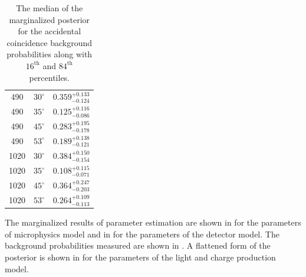 \begin{table}[p]
\begin{tabular}{cc|c}
490 & $30^{\circ}$ & $0.359^{+0.133}_{-0.124}$ \\
490 & $35^{\circ}$ & $0.125^{+0.116}_{-0.086}$ \\
490 & $45^{\circ}$ & $0.283^{+0.195}_{-0.178}$ \\
490 & $53^{\circ}$ & $0.189^{+0.138}_{-0.121}$ \\

1020 & $30^{\circ}$ & $0.384^{+0.150}_{-0.154}$ \\
1020 & $35^{\circ}$ & $0.108^{+0.115}_{-0.071}$ \\
1020 & $45^{\circ}$ & $0.364^{+0.247}_{-0.203}$ \\
1020 & $53^{\circ}$ & $0.264^{+0.109}_{-0.113}$ \\

\end{tabular}
\caption{The median of the marginalized posterior for the accidental coincidence background probabilities along with $16^{\textrm{th}}$ and $84^{\textrm{th}}$ percentiles.}
\label{tab:nerix_bkg_prob}



\end{table}





The marginalized results of parameter estimation are shown in  for the parameters of microphysics model and in  for the parameters of the detector model.  The background probabilities measured are shown in .  A flattened form of the posterior is shown in  for the parameters of the light and charge production model.  






